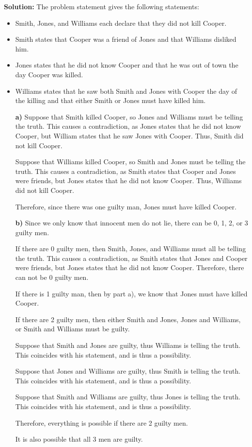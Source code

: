 \documentclass{Axon}
\begin{document}
\noindent
\textbf{Solution:}
The problem statement gives the following statements:
\begin{itemize}
    \item Smith, Jones, and Williams each declare that they did not kill Cooper.
    \item Smith states that Cooper was a friend of Jones and that Williams disliked him.
    \item Jones states that he did not know Cooper and that he was out of town the day Cooper was killed.
    \item Williams states that he saw both Smith and Jones with Cooper the day of the killing and that either Smith or Jones must have killed him.
\end{itemize}
\begin{enumerate}
    \item[\textbf{a)}]
    Suppose that Smith killed Cooper, so Jones and Williams must be telling the truth. This causes a contradiction, as Jones states that he did not know Cooper, but William states that he saw Jones with Cooper. Thus, Smith did not kill Cooper.

    Suppose that Williams killed Cooper, so Smith and Jones must be telling the truth. This causes a contradiction, as Smith states that Cooper and Jones were friends, but Jones states that he did not know Cooper. Thus, Williams did not kill Cooper.

    Therefore, since there was one guilty man, Jones must have killed Cooper.
    
    \item[\textbf{b)}]
    Since we only know that innocent men do not lie, there can be 0, 1, 2, or 3 guilty men.

    If there are 0 guilty men, then Smith, Jones, and Williams must all be telling the truth. This causes a contradiction, as Smith states that Jones and Cooper were friends, but Jones states that he did not know Cooper. Therefore, there can not be 0 guilty men.
    
    If there is 1 guilty man, then by part a), we know that Jones must have killed Cooper.

    If there are 2 guilty men, then either Smith and Jones, Jones and Williams, or Smith and Williams must be guilty.
    
    Suppose that Smith and Jones are guilty, thus Williams is telling the truth. This coincides with his statement, and is thus a possibility.
    
    Suppose that Jones and Williams are guilty, thus Smith is telling the truth. This coincides with his statement, and is thus a possibility.

    Suppose that Smith and Williams are guilty, thus Jones is telling the truth. This coincides with his statement, and is thus a possibility.

    Therefore, everything is possible if there are 2 guilty men.

    It is also possible that all 3 men are guilty.
\end{enumerate}
\end{document}
